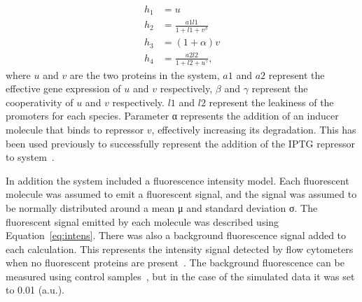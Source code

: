 \begin{align}
h_1 &= u \label{eq:eg1}\\
h_2 &= \frac{a1  l1	}{1+l1+v^{β}} \label{eq:eg2}\\
h_3 &= (1 + α) v \label{eq:eg3}\\
h_4 &= \frac{a2 l2}{1+l2+u^{γ}} \label{eq:eg4},
\end{align}
\noindent where $u$ and $v$ are the two proteins in the system, $a1$ and $a2$ represent the effective gene expression of $u$ and $v$ respectively, $β$ and $γ$ represent the cooperativity of $u$ and $v$ respectively. $l1$ and $l2$ represent the leakiness of the promoters for each species. Parameter α represents the addition of an inducer molecule that binds to repressor $v$, effectively increasing its degradation. This has been used previously to successfully represent the addition of the IPTG repressor to system~\autocite{Lillacci:2013hu}.

In addition the system included a fluorescence intensity model. Each fluorescent molecule was assumed to emit a fluorescent signal, and the signal was assumed to be normally distributed around a mean μ and standard deviation σ. The fluorescent signal emitted by each molecule was described using Equation~\ref{eq:intens}. There was also a background fluorescence signal added to each calculation. This represents the intensity signal detected by flow cytometers when no fluorescent proteins are present~\autocite{Lillacci:2013hu}. The background fluorescence can be measured using control samples~\autocite{Lillacci:2013hu}, but in the case of the simulated data it was set to 0.01 (a.u.).  


